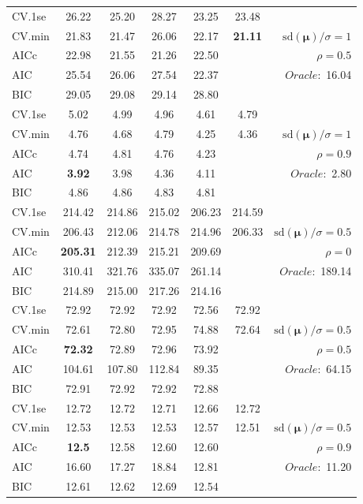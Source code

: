 \begin{table}
\begin{center}
\begin{tabular}{l*{5}{c}|r}
 \hline 
CV.1se & 26.22 & 25.20 & 28.27 & 23.25 & 23.48 & \\
CV.min & 21.83 & 21.47 & 26.06 & 22.17 & {\bf 21.11} &  $\mathrm{sd}(\mathbf{\mu})/\sigma=1$ \\
AICc & 22.98 & 21.55 & 21.26 & 22.50 & & $\rho=0.5$ \\
AIC & 25.54 & 26.06 & 27.54 & 22.37 & &  \multirow{2}{*}{$Oracle: $ 16.04} \\
BIC & 29.05 & 29.08 & 29.14 & 28.80 & &  \\
 \hline 
CV.1se & 5.02 & 4.99 & 4.96 & 4.61 & 4.79 & \\
CV.min & 4.76 & 4.68 & 4.79 & 4.25 & 4.36 &  $\mathrm{sd}(\mathbf{\mu})/\sigma=1$ \\
AICc & 4.74 & 4.81 & 4.76 & 4.23 & & $\rho=0.9$ \\
AIC & {\bf 3.92} & 3.98 & 4.36 & 4.11 & &  \multirow{2}{*}{$Oracle: $ 2.80} \\
BIC & 4.86 & 4.86 & 4.83 & 4.81 & &  \\
 \hline 
CV.1se & 214.42 & 214.86 & 215.02 & 206.23 & 214.59 & \\
CV.min & 206.43 & 212.06 & 214.78 & 214.96 & 206.33 &  $\mathrm{sd}(\mathbf{\mu})/\sigma=0.5$ \\
AICc & {\bf 205.31} & 212.39 & 215.21 & 209.69 & & $\rho=0$ \\
AIC & 310.41 & 321.76 & 335.07 & 261.14 & &  \multirow{2}{*}{$Oracle: $ 189.14} \\
BIC & 214.89 & 215.00 & 217.26 & 214.16 & &  \\
 \hline 
CV.1se & 72.92 & 72.92 & 72.92 & 72.56 & 72.92 & \\
CV.min & 72.61 & 72.80 & 72.95 & 74.88 & 72.64 &  $\mathrm{sd}(\mathbf{\mu})/\sigma=0.5$ \\
AICc & {\bf 72.32} & 72.89 & 72.96 & 73.92 & & $\rho=0.5$ \\
AIC & 104.61 & 107.80 & 112.84 & 89.35 & &  \multirow{2}{*}{$Oracle: $ 64.15} \\
BIC & 72.91 & 72.92 & 72.92 & 72.88 & &  \\
 \hline 
CV.1se & 12.72 & 12.72 & 12.71 & 12.66 & 12.72 & \\
CV.min & 12.53 & 12.53 & 12.53 & 12.57 & 12.51 &  $\mathrm{sd}(\mathbf{\mu})/\sigma=0.5$ \\
AICc & {\bf 12.5} & 12.58 & 12.60 & 12.60 & & $\rho=0.9$ \\
AIC & 16.60 & 17.27 & 18.84 & 12.81 & &  \multirow{2}{*}{$Oracle: $ 11.20} \\
BIC & 12.61 & 12.62 & 12.69 & 12.54 & &  \\
 \hline 
\end{tabular}
\end{center}
\vspace{-1cm}
\end{table}




